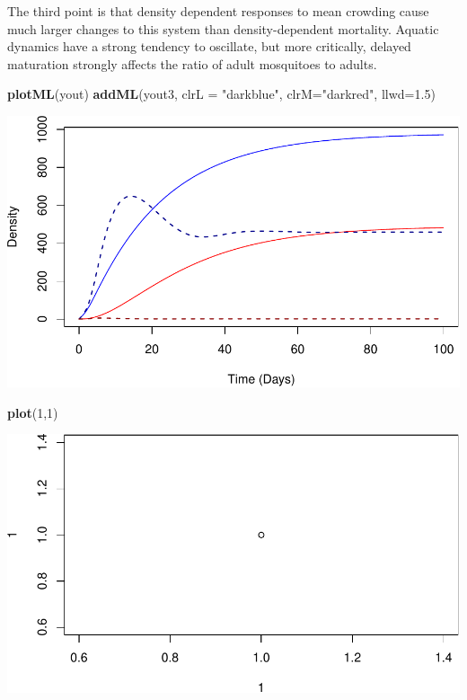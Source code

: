 \documentclass[
]{book}
\newenvironment{Shaded}{\begin{snugshade}}{\end{snugshade}}
\newcommand{\AttributeTok}[1]{\textcolor[rgb]{0.13,0.29,0.53}{#1}}
\newcommand{\DecValTok}[1]{\textcolor[rgb]{0.00,0.00,0.81}{#1}}
\newcommand{\FloatTok}[1]{\textcolor[rgb]{0.00,0.00,0.81}{#1}}
\newcommand{\FunctionTok}[1]{\textcolor[rgb]{0.13,0.29,0.53}{\textbf{#1}}}
\newcommand{\NormalTok}[1]{#1}
\newcommand{\StringTok}[1]{\textcolor[rgb]{0.31,0.60,0.02}{#1}}
\begin{document}
The third point is that density dependent responses to mean crowding cause much larger changes to this system than density-dependent mortality. Aquatic dynamics have a strong tendency to oscillate, but more critically, delayed maturation strongly affects the ratio of adult mosquitoes to adults.

\begin{Shaded}
\begin{Highlighting}[]
\FunctionTok{plotML}\NormalTok{(yout)}
\FunctionTok{addML}\NormalTok{(yout3, }\AttributeTok{clrL =} \StringTok{"darkblue"}\NormalTok{, }\AttributeTok{clrM=}\StringTok{"darkred"}\NormalTok{, }\AttributeTok{llwd=}\FloatTok{1.5}\NormalTok{)}
\end{Highlighting}
\end{Shaded}

\includegraphics{_main_files/figure-latex/compareML-1.pdf}

\begin{Shaded}
\begin{Highlighting}[]
\FunctionTok{plot}\NormalTok{(}\DecValTok{1}\NormalTok{,}\DecValTok{1}\NormalTok{)}
\end{Highlighting}
\end{Shaded}

\includegraphics{_main_files/figure-latex/test-1.pdf}
\end{document}
